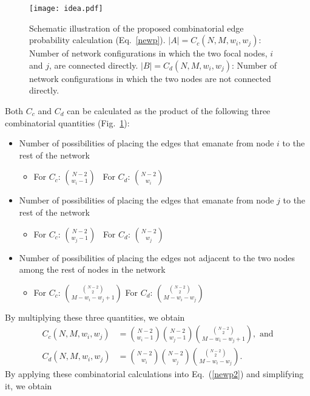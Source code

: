 \documentclass{llncs}
\begin{document}
\begin{figure}[t]
\centering
\texttt{[image: idea.pdf]}
\caption{Schematic illustration of the proposed combinatorial edge
  probability calculation (Eq.~\ref{newp}). $|A|=C_c(N, M, w_i, w_j)$:
  Number of network configurations in which the two focal nodes, $i$
  and $j$, are connected directly. $|B|=C_d(N, M, w_i, w_j)$: Number
  of network configurations in which the two nodes are not connected
  directly.}
\label{idea}
\end{figure}

Both $C_c$ and $C_d$ can be calculated as the product of the following
three combinatorial quantities (Fig.~\ref{idea}):
\begin{itemize}
\item Number of possibilities of placing the edges that emanate from
  node $i$ to the rest of the network
\begin{itemize}
\item For $C_c$: $\displaystyle\binom{N-2}{w_i-1}$
\quad \quad\quad \quad\quad \quad\,
For $C_d$: $\displaystyle\binom{N-2}{w_i}$
\end{itemize}
\item Number of possibilities of placing the edges that emanate from
  node $j$ to the rest of the network
\begin{itemize}
\item For $C_c$: $\displaystyle\binom{N-2}{w_j-1}$
\quad \quad\quad \quad\quad \quad\,
For $C_d$: $\displaystyle\binom{N-2}{w_j}$
\end{itemize}
\item Number of possibilities of placing the edges not adjacent to the
  two nodes among the rest of nodes in the network
\begin{itemize}
\item For $C_c$: $\displaystyle\binom{\binom{N-2}{2}}{M-w_i-w_j+1}$
\quad \quad
For $C_d$: $\displaystyle\binom{\binom{N-2}{2}}{M-w_i-w_j}$
\end{itemize}
\end{itemize}
By multiplying these three quantities, we obtain
\begin{align}
C_c(N, M, w_i, w_j) &= \binom{N-2}{w_i-1}\binom{N-2}{w_j-1} \binom{\binom{N-2}{2}}{M-w_i-w_j+1}, \text{ and}\\
C_d(N, M, w_i, w_j) &= \binom{N-2}{w_i} \binom{N-2}{w_j}\binom{\binom{N-2}{2}}{M-w_i-w_j}.
\end{align}
By applying these combinatorial calculations into Eq.~(\ref{newp2}) and
simplifying it, we obtain 
\end{document}

